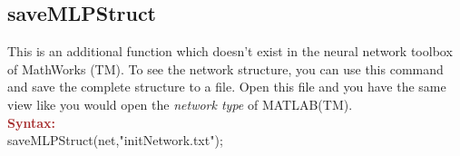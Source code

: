 \subsection{saveMLPStruct}
This is an additional function which doesn't exist in the neural network toolbox of MathWorks (TM). To see the network structure, you can use this command and save the complete structure to a file. Open this file and you have the same view like you would open the \textit{network type} of MATLAB(TM).\\

\noindent \textbf{\textcolor{brown}{Syntax:}}\\

\noindent saveMLPStruct(net,"initNetwork.txt");\\




